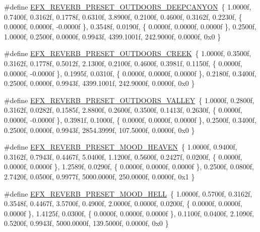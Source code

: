 \begin{DoxyCompactItemize}
\item 
\#define \mbox{\hyperlink{efx-presets_8h_a53c7c39adc1ee092ac71b0a5e4a30bb4}{E\+F\+X\+\_\+\+R\+E\+V\+E\+R\+B\+\_\+\+P\+R\+E\+S\+E\+T\+\_\+\+O\+U\+T\+D\+O\+O\+R\+S\+\_\+\+D\+E\+E\+P\+C\+A\+N\+Y\+ON}}~\{ 1.\+0000f, 0.\+7400f, 0.\+3162f, 0.\+1778f, 0.\+6310f, 3.\+8900f, 0.\+2100f, 0.\+4600f, 0.\+3162f, 0.\+2230f, \{ 0.\+0000f, 0.\+0000f, -\/0.\+0000f \}, 0.\+3548f, 0.\+0190f, \{ 0.\+0000f, 0.\+0000f, 0.\+0000f \}, 0.\+2500f, 1.\+0000f, 0.\+2500f, 0.\+0000f, 0.\+9943f, 4399.\+1001f, 242.\+9000f, 0.\+0000f, 0x0 \}
\item 
\#define \mbox{\hyperlink{efx-presets_8h_a0f06675ed7b200e2681fa3a8ca33ea8e}{E\+F\+X\+\_\+\+R\+E\+V\+E\+R\+B\+\_\+\+P\+R\+E\+S\+E\+T\+\_\+\+O\+U\+T\+D\+O\+O\+R\+S\+\_\+\+C\+R\+E\+EK}}~\{ 1.\+0000f, 0.\+3500f, 0.\+3162f, 0.\+1778f, 0.\+5012f, 2.\+1300f, 0.\+2100f, 0.\+4600f, 0.\+3981f, 0.\+1150f, \{ 0.\+0000f, 0.\+0000f, -\/0.\+0000f \}, 0.\+1995f, 0.\+0310f, \{ 0.\+0000f, 0.\+0000f, 0.\+0000f \}, 0.\+2180f, 0.\+3400f, 0.\+2500f, 0.\+0000f, 0.\+9943f, 4399.\+1001f, 242.\+9000f, 0.\+0000f, 0x0 \}
\item 
\#define \mbox{\hyperlink{efx-presets_8h_afb3c0613ee957fd34d407431712c9526}{E\+F\+X\+\_\+\+R\+E\+V\+E\+R\+B\+\_\+\+P\+R\+E\+S\+E\+T\+\_\+\+O\+U\+T\+D\+O\+O\+R\+S\+\_\+\+V\+A\+L\+L\+EY}}~\{ 1.\+0000f, 0.\+2800f, 0.\+3162f, 0.\+0282f, 0.\+1585f, 2.\+8800f, 0.\+2600f, 0.\+3500f, 0.\+1413f, 0.\+2630f, \{ 0.\+0000f, 0.\+0000f, -\/0.\+0000f \}, 0.\+3981f, 0.\+1000f, \{ 0.\+0000f, 0.\+0000f, 0.\+0000f \}, 0.\+2500f, 0.\+3400f, 0.\+2500f, 0.\+0000f, 0.\+9943f, 2854.\+3999f, 107.\+5000f, 0.\+0000f, 0x0 \}
\item 
\#define \mbox{\hyperlink{efx-presets_8h_a57bd7019d4f82fc9cbc1e9e1796c7bff}{E\+F\+X\+\_\+\+R\+E\+V\+E\+R\+B\+\_\+\+P\+R\+E\+S\+E\+T\+\_\+\+M\+O\+O\+D\+\_\+\+H\+E\+A\+V\+EN}}~\{ 1.\+0000f, 0.\+9400f, 0.\+3162f, 0.\+7943f, 0.\+4467f, 5.\+0400f, 1.\+1200f, 0.\+5600f, 0.\+2427f, 0.\+0200f, \{ 0.\+0000f, 0.\+0000f, 0.\+0000f \}, 1.\+2589f, 0.\+0290f, \{ 0.\+0000f, 0.\+0000f, 0.\+0000f \}, 0.\+2500f, 0.\+0800f, 2.\+7420f, 0.\+0500f, 0.\+9977f, 5000.\+0000f, 250.\+0000f, 0.\+0000f, 0x1 \}
\item 
\#define \mbox{\hyperlink{efx-presets_8h_accdcedee2b00834ee55cd5a557a37eba}{E\+F\+X\+\_\+\+R\+E\+V\+E\+R\+B\+\_\+\+P\+R\+E\+S\+E\+T\+\_\+\+M\+O\+O\+D\+\_\+\+H\+E\+LL}}~\{ 1.\+0000f, 0.\+5700f, 0.\+3162f, 0.\+3548f, 0.\+4467f, 3.\+5700f, 0.\+4900f, 2.\+0000f, 0.\+0000f, 0.\+0200f, \{ 0.\+0000f, 0.\+0000f, 0.\+0000f \}, 1.\+4125f, 0.\+0300f, \{ 0.\+0000f, 0.\+0000f, 0.\+0000f \}, 0.\+1100f, 0.\+0400f, 2.\+1090f, 0.\+5200f, 0.\+9943f, 5000.\+0000f, 139.\+5000f, 0.\+0000f, 0x0 \}

\end{DoxyCompactItemize}
